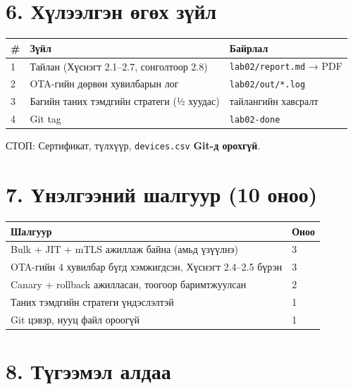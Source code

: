 \hypertarget{ux445ux4afux43bux44dux44dux43bux433ux44dux43d-ux4e9ux433ux4e9ux445-ux437ux4afux439ux43b}{%
\section{6. Хүлээлгэн өгөх зүйл}\label{ux445ux4afux43bux44dux44dux43bux433ux44dux43d-ux4e9ux433ux4e9ux445-ux437ux4afux439ux43b}}

\begingroup\scriptsize\begin{longtable}[]{@{}lll@{}}
\toprule
\# & Зүйл & Байрлал\tabularnewline
\midrule
\endhead
1 & Тайлан (Хүснэгт 2.1--2.7, сонголтоор 2.8) & \texttt{lab02/report.md} → PDF\tabularnewline
2 & OTA-гийн дөрвөн хувилбарын лог & \texttt{lab02/out/*.log}\tabularnewline
3 & Багийн таних тэмдгийн стратеги (½ хуудас) & тайлангийн хавсралт\tabularnewline
4 & Git tag & \texttt{lab02-done}\tabularnewline
\bottomrule
\end{longtable}\endgroup

СТОП: Сертификат, түлхүүр, \texttt{devices.csv} \textbf{Git-д орохгүй}.

\hypertarget{ux4afux43dux44dux43bux433ux44dux44dux43dux438ux439-ux448ux430ux43bux433ux443ux443ux440-10-ux43eux43dux43eux43e}{%
\section{7. Үнэлгээний шалгуур (10 оноо)}\label{ux4afux43dux44dux43bux433ux44dux44dux43dux438ux439-ux448ux430ux43bux433ux443ux443ux440-10-ux43eux43dux43eux43e}}

\begingroup\scriptsize\begin{longtable}[]{@{}ll@{}}
\toprule
Шалгуур & Оноо\tabularnewline
\midrule
\endhead
Bulk + JIT + mTLS ажиллаж байна (амьд үзүүлнэ) & 3\tabularnewline
OTA-гийн 4 хувилбар бүгд хэмжигдсэн, Хүснэгт 2.4--2.5 бүрэн & 3\tabularnewline
Canary + rollback ажилласан, тоогоор баримтжуулсан & 2\tabularnewline
Таних тэмдгийн стратеги үндэслэлтэй & 1\tabularnewline
Git цэвэр, нууц файл ороогүй & 1\tabularnewline
\bottomrule
\end{longtable}\endgroup

\hypertarget{ux442ux4afux433ux44dux44dux43cux44dux43b-ux430ux43bux434ux430ux430}{%
\section{8. Түгээмэл алдаа}\label{ux442ux4afux433ux44dux44dux43cux44dux43b-ux430ux43bux434ux430ux430}}

